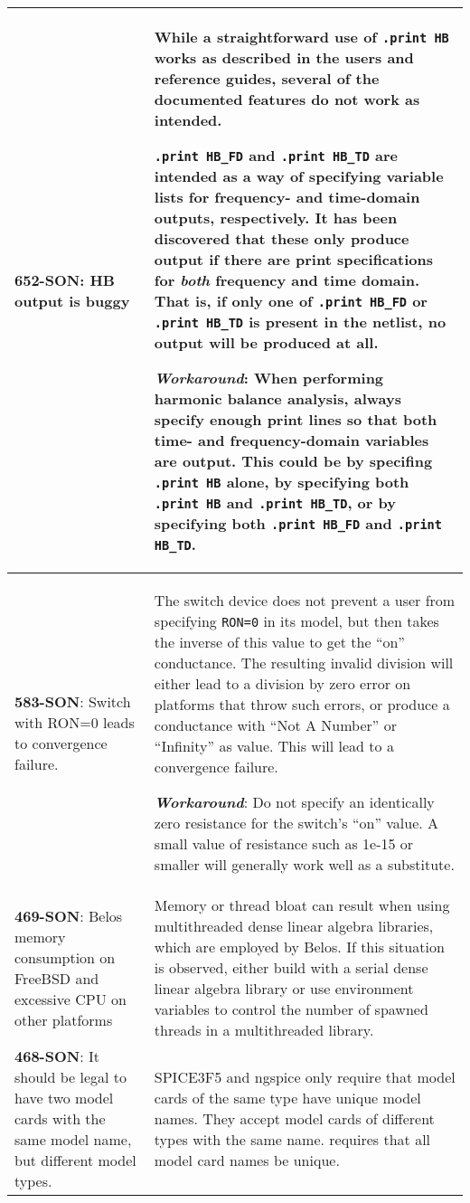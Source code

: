 {\begin{longtable}[h] {>{\raggedright\small}m{2in}|>{\raggedright\let\\\tabularnewline\small}m{3.5in}}
\textbf{652-SON}: HB output is buggy & While a straightforward use of
\texttt{.print HB} works as described in the users and reference guides,
several of the documented features do not work as intended.

\texttt{.print HB\_FD} and \texttt{.print HB\_TD} are intended as a way of
specifying variable lists for frequency- and time-domain outputs,
respectively.  It has been discovered that these only produce output
if there are print specifications for {\em both\/} frequency and time
domain.  That is, if only one of \texttt{.print HB\_FD}
or \texttt{.print HB\_TD} is present in the netlist, no output will be
produced at all.

\textbf{\textit{Workaround}}: When performing harmonic balance analysis,
always specify enough print lines so that both time- and
frequency-domain variables are output.  This could be by
specifing \texttt{.print HB} alone, by specifying both \texttt{.print
HB} and \texttt{.print HB\_TD}, or by specifying both \texttt{.print
HB\_FD} and \texttt{.print HB\_TD}.
\\ \hline


\textbf{583-SON}: Switch with RON=0 leads to convergence failure. &
The switch device does not prevent a user from
specifying \texttt{RON=0} in its model, but then takes the inverse of
this value to get the ``on'' conductance.  The resulting invalid
division will either lead to a division by zero error on platforms
that throw such errors, or produce a conductance with ``Not A Number''
or ``Infinity'' as value.  This will lead to a convergence failure.

\textbf{\textit{Workaround}}: Do not specify an identically zero resistance
for the switch's ``on'' value.  A small value of resistance such as
1e-15 or smaller will generally work well as a substitute. \\ \hline


\textbf{469-SON}: Belos memory consumption on FreeBSD and excessive CPU on other
platforms & Memory or thread bloat can result when using multithreaded
dense linear algebra libraries, which are employed by Belos.  If this
situation is observed, either build
\Xyce{} with a serial dense linear algebra library or use environment variables
to control the number of spawned threads in a multithreaded library.
\\ \hline


\textbf{468-SON}: It should be legal to have two model cards with the same model
name, but different model types. & SPICE3F5 and ngspice only require
that model cards of the same type have unique model names. They accept
model cards of different types with the same name.  \Xyce{} requires
that all model card names be unique.
\\ \hline



\end{longtable}}
